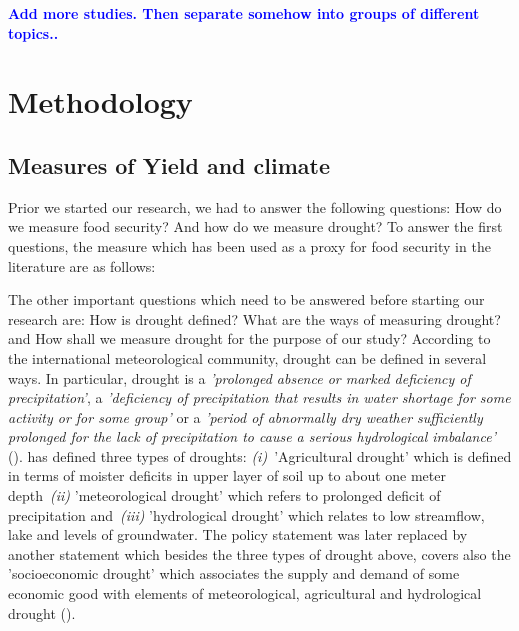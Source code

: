 \documentclass[a4paper,12pt]{article}
\begin{document}
\textcolor{blue}{\textbf{Add more studies. Then separate somehow into groups of different topics..}}


\section{Methodology}\label{Method}

\subsection{Measures of Yield and climate}

 
Prior we started  our research, we had to answer the following questions: How do we measure food security? And how do we measure drought? To answer the first questions, the measure which has been used as a proxy for food security in the literature are as follows:
 
\vspace{2cm}

The other important questions which need to be answered before starting our research are: How is drought defined? What are the ways of measuring drought? and How shall we measure drought for the purpose of our study? According to the international meteorological community, drought can be defined in several ways. In particular, drought is a \textit{'prolonged absence or marked deficiency of precipitation'}, a \textit{'deficiency of precipitation that results in water shortage for some activity or for some group'} or a \textit{'period of abnormally dry weather sufficiently prolonged for the lack of precipitation to cause a serious hydrological imbalance'} (\citealp{Heim2002, IPCCtrenberth}).
 \cite{AMS1997} has defined three types of droughts: \textit{(i)}~'Agricultural drought' which is defined in terms of moister deficits in upper layer of soil up to about one meter depth~\textit{(ii)} 'meteorological drought' which refers to prolonged deficit of precipitation and~\textit{(iii)} 'hydrological drought' which relates to low streamflow, lake and levels of groundwater. The  \cite{AMS1997} policy statement was later replaced by another statement \citep{AMS2013} which besides the three types of drought above, covers also the 'socioeconomic drought' which associates the supply and demand of some economic good with elements of meteorological, agricultural and hydrological drought (\citealt{Heim2002, IPCCtrenberth}).
 
\end{document}
